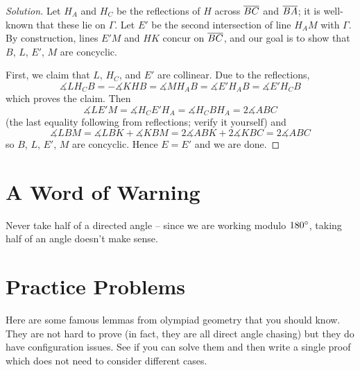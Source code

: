 \documentclass[11pt]{scrartcl}
\begin{document}
\begin{proof}
	[Solution] Let $H_A$ and $H_C$ be the reflections of $H$ across $\overline{BC}$ and $\overline{BA}$; it is well-known that these lie on $\Gamma$.  Let $E'$ be the second intersection of line $H_AM$ with $\Gamma$. By construction, lines $E'M$ and $HK$ concur on $\overline{BC}$, and our goal is to show that $B$, $L$, $E'$, $M$ are concyclic.

	First, we claim that $L$, $H_C$, and $E'$ are collinear. 
	Due to the reflections,
	\[ \measuredangle LH_CB = -\measuredangle KHB = \measuredangle MH_AB 
	= \measuredangle E'H_AB = \measuredangle E'H_CB \]
	which proves the claim.
	Then
	\[ \measuredangle LE'M = \measuredangle H_CE'H_A = \measuredangle H_CBH_A = 2\measuredangle ABC \]
	(the last equality following from reflections; verify it yourself) and
	\[ \measuredangle LBM = \measuredangle LBK + \measuredangle KBM = 2\measuredangle ABK + 2\measuredangle KBC = 2\measuredangle ABC \]
	so $B$, $L$, $E'$, $M$ are concyclic. Hence $E=E'$ and we are done.
\end{proof}



\section{A Word of Warning}
Never take half of a directed angle -- since we are working modulo $180^\circ$,
taking half of an angle doesn't make sense.


\section{Practice Problems}
Here are some famous lemmas from olympiad geometry that you should know.
They are not hard to prove (in fact, they are all direct angle chasing) but they do have configuration issues.
See if you can solve them and then write a single proof which does not need to consider different cases.
\end{document}
